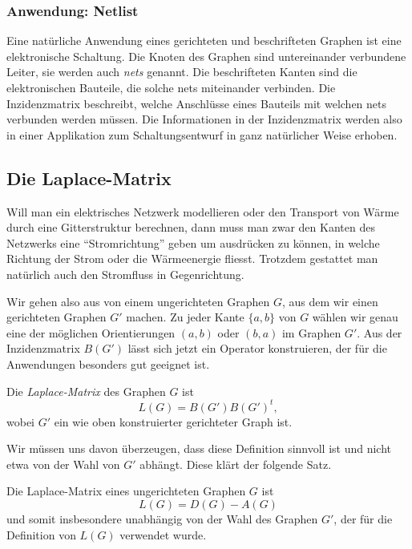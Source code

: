\subsubsection{Anwendung: Netlist}
Eine natürliche Anwendung eines gerichteten und beschrifteten Graphen
ist eine elektronische Schaltung.
Die Knoten des Graphen sind untereinander verbundene Leiter, sie werden
auch {\em nets} genannt. 
Die beschrifteten Kanten sind die elektronischen Bauteile, die solche
nets miteinander verbinden.
Die Inzidenzmatrix beschreibt, welche Anschlüsse eines Bauteils mit
welchen nets verbunden werden müssen.
Die Informationen in der Inzidenzmatrix werden also in einer
Applikation zum Schaltungsentwurf in ganz natürlicher Weise erhoben.

\subsection{Die Laplace-Matrix
\label{subsection:laplace-matrix}}
Will man ein elektrisches Netzwerk modellieren oder den Transport
von Wärme durch eine Gitterstruktur berechnen, dann muss man zwar den
Kanten des Netzwerks eine ``Stromrichtung'' geben um ausdrücken zu können,
in welche Richtung der Strom oder die Wärmeenergie fliesst.
Trotzdem gestattet man natürlich auch den Stromfluss in Gegenrichtung.

Wir gehen also aus von einem ungerichteten Graphen $G$, aus dem
wir einen gerichteten Graphen $G'$ machen.
Zu jeder Kante $\{a,b\}$ von $G$ wählen wir genau eine der möglichen
Orientierungen $(a,b)$ oder $(b,a)$ im Graphen $G'$.
Aus der Inzidenzmatrix $B(G')$ lässt sich jetzt ein Operator konstruieren,
der für die Anwendungen besonders gut geeignet ist.

\begin{definition}
\label{buch:graphen:def:laplace-matrix}
Die {\em Laplace-Matrix} des Graphen $G$ ist
\[
L(G) = B(G')B(G')^t,
\]
wobei $G'$ ein wie oben konstruierter gerichteter Graph ist.
\end{definition}

Wir müssen uns davon überzeugen, dass diese Definition sinnvoll ist
und nicht etwa von der Wahl von $G'$ abhängt.
Diese klärt der folgende Satz.

\begin{satz}
Die Laplace-Matrix eines ungerichteten Graphen $G$ ist
\begin{equation}
L(G) = D(G) - A(G)
\label{buch:graphen:eqn:laplace-definition}
\end{equation}
und somit insbesondere unabhängig von der Wahl des Graphen $G'$,
der für die Definition von $L(G)$ verwendet wurde.
\end{satz}

